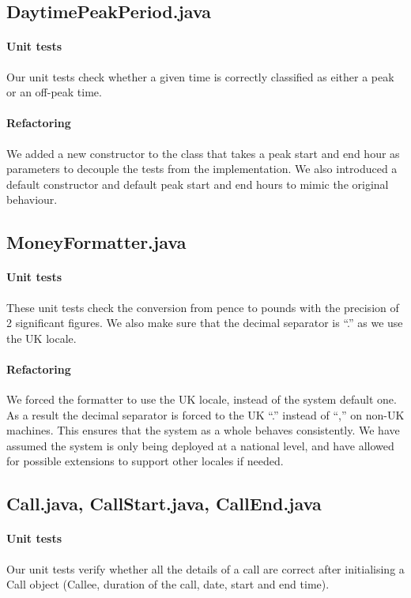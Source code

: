\documentclass[a4paper]{article}
\begin{document}
\subsection{DaytimePeakPeriod.java}
\paragraph{Unit tests} Our unit tests check whether a given time is correctly classified as either a peak or an off-peak time.
\paragraph{Refactoring} We added a new constructor to the class that takes a peak start and end hour as parameters to decouple the tests from the implementation. We also introduced a default constructor and default peak start and end hours to mimic the original behaviour.

\subsection{MoneyFormatter.java}
\paragraph{Unit tests} These unit tests check the conversion from pence to pounds with the precision of 2 significant figures. We also make sure that the decimal separator is ``.'' as we use the UK locale.
\paragraph{Refactoring} We forced the formatter to use the UK locale, instead of the system default one. As a result the decimal separator is forced to the UK ``.'' instead of ``,'' on non-UK machines. This ensures that the system as a whole behaves consistently. We have assumed the system is only being deployed at a national level, and have allowed for possible extensions to support other locales if needed.

\subsection{Call.java, CallStart.java, CallEnd.java}
\paragraph{Unit tests} Our unit tests verify whether all the details of a call are correct after initialising a Call object (Callee, duration of the call, date, start and end time).
\end{document}
